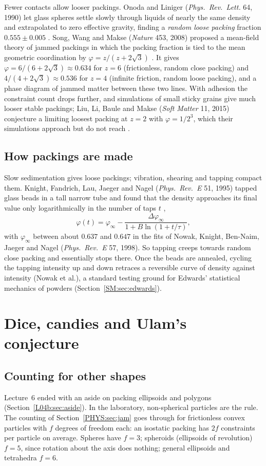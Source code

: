 \documentclass[11pt,openany]{book}
\theoremstyle{plain}
\theoremstyle{definition}
\theoremstyle{remark}
\begin{document}
Fewer contacts allow looser packings. Onoda and Liniger (\emph{Phys.\ Rev.\ Lett.} 64, 1990) let glass
spheres settle slowly through liquids of nearly the same density and extrapolated to zero effective
gravity, finding a \emph{random loose packing} fraction $0.555\pm0.005$ . Song, Wang and Makse
(\emph{Nature} 453, 2008) proposed a mean-field theory of jammed packings in which the packing fraction is
tied to the mean geometric coordination by $\varphi=z/(z+2\sqrt3)$ . It gives
$\varphi=6/(6+2\sqrt3)\approx0.634$ for $z=6$ (frictionless, random close packing) and
$4/(4+2\sqrt3)\approx0.536$ for $z=4$ (infinite friction, random loose packing), and a phase diagram of
jammed matter between these two lines. With adhesion the constraint count drops further, and simulations of
small sticky grains give much looser stable packings; Liu, Li, Baule and Makse (\emph{Soft Matter} 11, 2015)
conjecture a limiting loosest packing at $z=2$ with $\varphi=1/2^3$, which their simulations approach but
do not reach .

\subsection*{How packings are made}
Slow sedimentation gives loose packings; vibration, shearing and tapping compact them. Knight, Fandrich, Lau, Jaeger and Nagel (\emph{Phys.\ Rev.~E}
51, 1995) tapped glass beads in a tall narrow tube and found that the density approaches its final value
only logarithmically in the number of taps $t$ ,
\[
  \varphi(t)=\varphi_\infty-\frac{\Delta\varphi_\infty}{1+B\ln(1+t/\tau)},
\]
with $\varphi_\infty$ between about $0.637$ and $0.647$ in the fits of Nowak, Knight, Ben-Naim, Jaeger and Nagel
(\emph{Phys.\ Rev.~E} 57, 1998). So tapping creeps towards random close packing and essentially stops there. Once the beads are annealed,
cycling the tapping intensity up and down retraces a reversible curve of density against intensity
(Nowak et al.), a standard testing ground for Edwards' statistical mechanics of powders
(Section~\ref{SM:sec:edwards}).

\section{Dice, candies and Ulam's conjecture}
\label{PHYS:sec:shapes}

\subsection*{Counting for other shapes}
Lecture~6 ended with an aside on packing ellipsoids and polygons (Section~\ref{L04b:sec:aside}). In the
laboratory, non-spherical particles are the rule. The counting of Section~\ref{PHYS:sec:jam} goes through
for frictionless convex particles with $f$ degrees of freedom each: an isostatic packing has $2f$
constraints per particle on average. Spheres have $f=3$; spheroids (ellipsoids of revolution) $f=5$, since
rotation about the axis does nothing; general ellipsoids and tetrahedra $f=6$.
\end{document}
